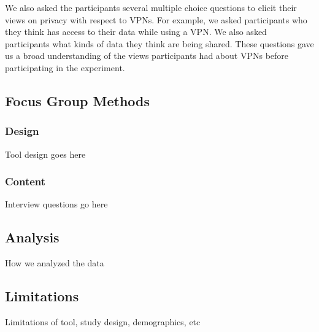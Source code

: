 We also asked the participants several multiple choice questions to elicit their views on privacy with respect to VPNs.
For example, we asked participants who they think has access to their data while using a VPN.
We also asked participants what kinds of data they think are being shared.
These questions gave us a broad understanding of the views participants had about VPNs before participating in the experiment.
 
\subsection{Focus Group Methods}


\subsubsection{Design}
Tool design goes here

\subsubsection{Content}
Interview questions go here

\subsection{Analysis} 
How we analyzed the data

\subsection{Limitations}
Limitations of tool, study design, demographics, etc
